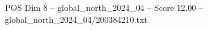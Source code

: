 \begin{textsample}{POS Dim 8 – global\_north\_2024\_04 – Score 12.00 – global\_north\_2024\_04/200384210.txt}
\end{textsample}
